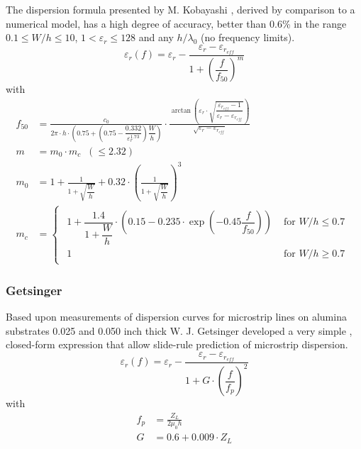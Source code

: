 \documentclass[10pt]{report}
\begin{document}
The dispersion formula presented by M. Kobayashi \cite{Kobayashi},
derived by comparison to a numerical model, has a high degree of
accuracy, better than 0.6\% in the range $0.1 \le W/h \le 10$, $1 <
\varepsilon_r \le 128$ and any $h/\lambda_0$ (no frequency limits).
\begin{equation}
\varepsilon_{r}(f) = \varepsilon_{r} - \frac{\varepsilon_{r} - \varepsilon_{r_{eff}}}{1 + \left(\dfrac{f}{f_{50}}\right)^{m}}
\end{equation}
with
\begin{align}
f_{50} &= \frac{c_{0}}{2\pi\cdot h \cdot\left(0.75 + \left(0.75 - \dfrac{0.332}{\varepsilon_{r}^{1.73}}\right)\dfrac{W}{h}\right)} \cdot \frac{\arctan\left(\varepsilon_{r}\cdot\sqrt{\dfrac{\varepsilon_{r_{eff}} - 1}{\varepsilon_{r} - \varepsilon_{r_{eff}}}}\right)}{\sqrt{\varepsilon_{r} - \varepsilon_{r_{eff}}}}\\
m &= m_{0}\cdot m_{c} \;\; (\le 2.32)\\
m_{0} &= 1 + \frac{1}{1 + \sqrt{\dfrac{W}{h}}} + 0.32\cdot\left(\frac{1}{1 + \sqrt{\dfrac{W}{h}}}\right)^{3}\\
m_{c} &=
\begin{cases}
\begin{array}{ll}
1 + \dfrac{1.4}{1 + \dfrac{W}{h}}\cdot\left(0.15 - 0.235\cdot\exp\left(-0.45\dfrac{f}{f_{50}}\right)\right) & \textrm{ for } W / h \le 0.7\\
1 & \textrm{ for } W / h \ge 0.7
\end{array}
\end{cases}
\end{align}

\subsubsection{Getsinger}

Based upon measurements of dispersion curves for microstrip lines on
alumina substrates 0.025 and 0.050 inch thick W. J. Getsinger
\cite{Getsinger} developed a very simple , closed-form expression that
allow slide-rule prediction of microstrip dispersion.
\begin{equation}
\varepsilon_{r}(f) = \varepsilon_{r} - \frac{\varepsilon_{r} - \varepsilon_{r_{eff}}}{1 + G\cdot \left(\dfrac{f}{f_{p}}\right)^{2}}
\end{equation}
with
\begin{align}
\label{eq:GetFp}
f_{p} &= \frac{Z_{L}}{2\mu_{0} h}\\
\label{eq:GetG}
G &= 0.6 + 0.009\cdot Z_{L}
\end{align}
\end{document}
